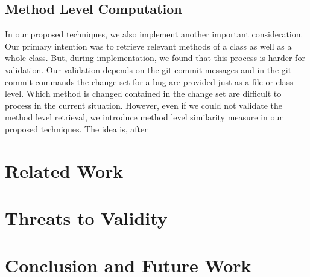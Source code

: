 \documentclass{sig-alternate}
\begin{document}
\subsection{Method Level Computation}
In our proposed techniques, we also implement another important consideration. Our primary intention was to retrieve relevant methods of a class as well as a whole class. But, during implementation, we found that this process is harder for validation. Our validation depends on the git commit messages and in the git commit commands the change set for a bug are provided just as a file or class level. Which method is changed contained in the change set are difficult to process in the current situation. However, even if we could not validate the method level retrieval, we introduce method level similarity measure in our proposed techniques. The idea is, after 

\section{Related Work}\label{sec:relatedWork}

\section{Threats to Validity}
\section{Conclusion and Future Work}\label{summary}






\scriptsize
\setlength{\bibsep}{0.0pt}

\end{document}

